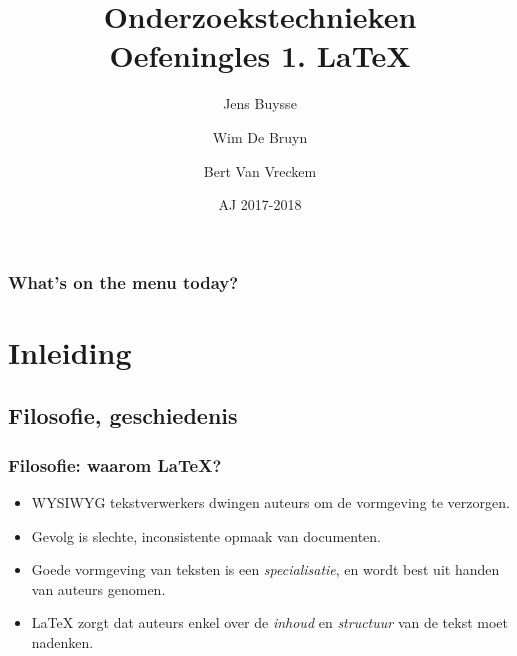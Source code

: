 \documentclass{beamer}
\title[Intro]{Onderzoekstechnieken\\Oefeningles 1. \LaTeX{}}
\author{Jens Buysse \and Wim {De Bruyn} \and Bert {Van Vreckem}}
\date{AJ 2017-2018}
\begin{document}

\HoGentLogo

\titleframe


\begin{frame}
  \frametitle{What's on the menu today?}

  \tableofcontents
\end{frame}

\section{Inleiding}

\subsection{Filosofie, geschiedenis}

\begin{frame}
  \frametitle{Filosofie: waarom {\LaTeX}?}
  
  \begin{itemize}
  \item<+-> WYSIWYG tekstverwerkers dwingen auteurs om de vormgeving te verzorgen.
  \item<+-> Gevolg is slechte, inconsistente opmaak van documenten.
  \item<+-> Goede vormgeving van teksten is een \emph{specialisatie}, en wordt best
    uit handen van auteurs genomen.
  \item<+-> {\LaTeX} zorgt dat auteurs enkel over de \emph{inhoud} en \emph{structuur} van de tekst moet nadenken.
  \end{itemize}
\end{frame}
\end{document}
